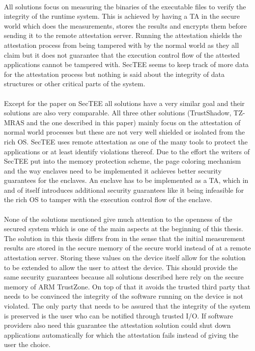 \paragraph*{}
All solutions focus on measuring the binaries of the executable files to verify the integrity of the runtime system. This is achieved by having a TA in the secure world which does the measurements, stores the results and encrypts them before sending it to the remote attestation server. Running the attestation shields the attestation process from being tampered with by the normal world as they all claim but it does not guarantee that the execution control flow of the attested applications cannot be tampered with. SecTEE seems to keep track of more data for the attestation process but nothing is said about the integrity of data structures or other critical parts of the system. 

\paragraph*{}
Except for the paper on SecTEE all solutions have a very similar goal and their solutions are also very comparable. All three other solutions (TrustShadow, TZ-MRAS and the one described in this paper) mainly focus on the attestation of normal world processes but these are not very well shielded or isolated from the rich OS. SecTEE uses remote attestation as one of the many tools to protect the applications or at least identify violations thereof. Due to the effort the writers of SecTEE put into the memory protection scheme, the page coloring mechanism and the way enclaves need to be implemented it achieves better security guarantees for the enclaves. An enclave has to be implemented as a TA, which in and of itself introduces additional security guarantees like it being infeasible for the rich OS to tamper with the execution control flow of the enclave.

\paragraph*{}
None of the solutions mentioned give much attention to the openness of the secured system which is one of the main aspects at the beginning of this thesis. The solution in this thesis differs from \cite{LingZhen2021Sbtb} in the sense that the initial measurement results are stored in the secure memory of the secure world instead of at a remote attestation server. Storing these values on the device itself allow for the solution to be extended to allow the user to attest the device. This should provide the same security guarantees because all solutions described here rely on the secure memory of ARM TrustZone. On top of that it avoids the trusted third party that needs to be convinced the integrity of the software running on the device is not violated. The only party that needs to be assured that the integrity of the system is preserved is the user who can be notified through trusted I/O. If software providers also need this guarantee the attestation solution could shut down applications automatically for which the attestation fails instead of giving the user the choice.


